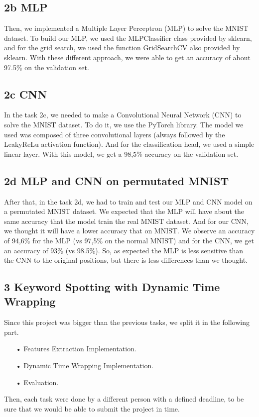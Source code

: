 \documentclass[12pt]{article}
\begin{document}
\subsection*{2b MLP}
Then, we implemented a Multiple Layer Perceptron (MLP) to solve the MNIST dataset. To build our MLP, we used the MLPClassifier class provided by sklearn, and for the grid search, we used the function GridSearchCV also provided by sklearn. With these different approach, we were able to get an accuracy of about 97.5\% on the validation set.
\subsection*{2c CNN}
In the task 2c, we needed to make a Convolutional Neural Network (CNN) to solve the MNIST dataset. To do it, we use the PyTorch library. The model we used was composed of three convolutional layers (always followed by the LeakyReLu activation function). And for the classification head, we used a simple linear layer.
With this model, we get a 98,5\% accuracy on the validation set.
\subsection*{2d MLP and CNN on permutated MNIST}
After that, in the task 2d, we had to train and test our MLP and CNN model on a permutated MNIST dataset. We expected that the MLP will have about the same accuracy that the model train  the real MNIST dataset. And for our CNN, we thought it will have a lower accuracy that on MNIST.
\newline We observe an accuracy of 94,6\% for the MLP (vs 97,5\% on the normal MNIST) and for the CNN, we get an accuracy of 93\% (vs 98.5\%). So, as expected the MLP is less sensitive than the CNN to the original positions, but there is less differences than we thought. 

\subsection*{3 Keyword Spotting with Dynamic Time Wrapping}
Since this project was bigger than the previous tasks, we split it in the following part. 
\begin{enumerate}
\item[•]Features Extraction Implementation.
\item[•]Dynamic Time Wrapping Implementation.
\item[•]Evaluation.
\end{enumerate}
Then, each task were done by a different person with a defined deadline, to be sure that we would be able to submit the project in time.
\end{document}
